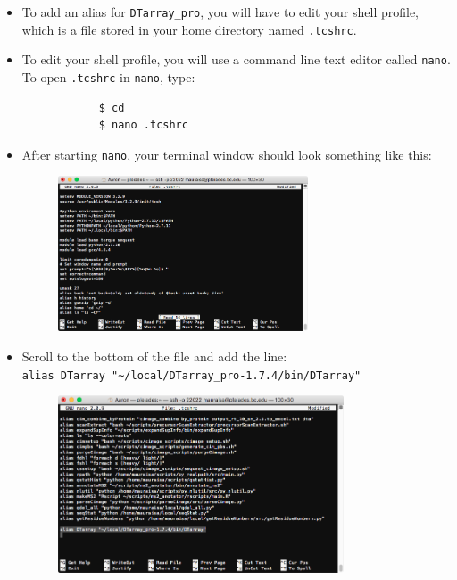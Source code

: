\documentclass[12pt]{article}
\begin{document}
	\begin{itemize}
		\item To add an alias for \texttt{DTarray\_pro}, you will have to edit your shell profile, which is a file stored in your home directory named \texttt{.tcshrc}.
		
		\item To edit your shell profile, you will use a command line text editor called \texttt{nano}. To open \texttt{.tcshrc} in \texttt{nano}, type:
		
		\begin{lstlisting}
			$ cd
			$ nano .tcshrc
		\end{lstlisting}
		
		\item After starting \texttt{nano}, your terminal window should look something like this:
		
		\begin{figure}[h!]
			\centering
			\includegraphics[width=0.7\textwidth]{step_1.png}
		\end{figure}
		
		\item Scroll to the bottom of the file and add the line: \\ \texttt{alias DTarray "\textasciitilde/local/DTarray\_pro-1.7.4/bin/DTarray"}
		
		\begin{figure}[h!]
			\centering
			\includegraphics[width=0.8\textwidth]{step_2.png}
		\end{figure}
	

\end{itemize}
\end{document}
